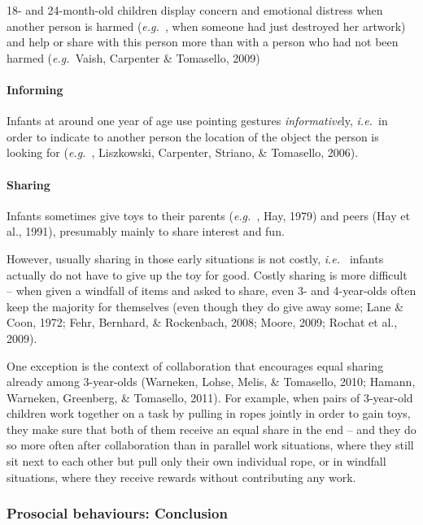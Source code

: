 \documentclass{article}
\newcommand{\ie}{{\textit{i.e.~}}}
\newcommand{\eg}{{\textit{e.g.~}}}
\begin{document}
18- and 24-month-old children display concern and emotional distress when
another person is harmed (\eg, when someone had just destroyed her artwork) and
help or share with this person more than with a person who had not been harmed
(\eg Vaish, Carpenter \& Tomasello, 2009) 

\paragraph{Informing}

Infants at around one year of age use pointing gestures \emph{informative}ly,
\ie in order to indicate to another person the location of the object the
person is looking for (\eg, Liszkowski, Carpenter, Striano, \& Tomasello, 2006).

\paragraph{Sharing}

Infants sometimes give toys to their parents (\eg, Hay, 1979) and peers
(Hay et al., 1991), presumably mainly to share interest and fun. 

However, usually sharing in those early situations is not costly, \ie
infants actually do not have to give up the toy for good. Costly sharing is
more difficult -- when given a windfall of items and asked to share, even 3- and
4-year-olds often keep the majority for themselves (even though they do give
away some; Lane \& Coon, 1972; Fehr, Bernhard, \& Rockenbach, 2008; Moore,
2009; Rochat et al., 2009). 

One exception is the context of collaboration that encourages equal
sharing already among 3-year-olds (Warneken, Lohse, Melis, \& Tomasello, 2010;
Hamann, Warneken, Greenberg, \& Tomasello, 2011). For example, when pairs of
3-year-old children work together on a task by pulling in ropes jointly in
order to gain toys, they make sure that both of them receive an equal share in
the end -- and they do so more often after collaboration than in parallel work
situations, where they still sit next to each other but pull only their own
individual rope, or in windfall situations, where they receive rewards without
contributing any work. 

\subsubsection{Prosocial behaviours: Conclusion}
\end{document}
